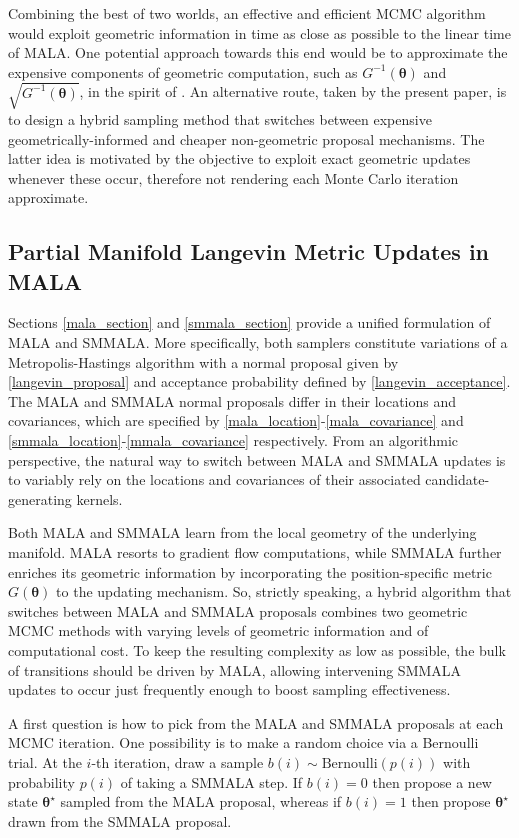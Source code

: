 \documentclass[twoside,11pt]{article}
\begin{document}
Combining the best of two worlds, an effective and efficient MCMC algorithm would exploit geometric information in time as 
close as possible to the linear time of MALA. One potential approach towards this end would be to approximate the expensive 
components of geometric computation, such as $G^{-1}(\boldsymbol{\theta})$ and $\sqrt{G^{-1}(\boldsymbol{\theta})}$, in the 
spirit of \cite{sim_bad_cem__sto}. An alternative route, taken by the present paper, is to design a hybrid sampling method 
that switches between expensive geometrically-informed and cheaper non-geometric proposal mechanisms. The latter idea is
motivated by the objective to exploit exact geometric updates whenever these occur, therefore not rendering each Monte Carlo 
iteration approximate.

\subsection{Partial Manifold Langevin Metric Updates in MALA}

Sections \ref{mala_section} and \ref{smmala_section} provide a unified formulation of MALA and SMMALA. More specifically, 
both samplers constitute variations of a Metropolis-Hastings algorithm with a normal proposal given by 
\eqref{langevin_proposal} and acceptance probability defined by \eqref{langevin_acceptance}. The MALA and SMMALA normal 
proposals differ in their locations and covariances, which are specified by \eqref{mala_location}-\eqref{mala_covariance} 
and \eqref{smmala_location}-\eqref{mmala_covariance} respectively. From an algorithmic perspective, the natural way to 
switch between MALA and SMMALA updates is to variably rely on the locations and covariances of their associated 
candidate-generating kernels.

Both MALA and SMMALA learn from the local geometry of the underlying manifold. MALA resorts to gradient flow computations, 
while SMMALA further enriches its geometric information by incorporating the position-specific metric 
$G(\boldsymbol{\theta})$ to the updating mechanism. So, strictly speaking, a hybrid algorithm that switches between MALA and 
SMMALA proposals combines two geometric MCMC methods with varying levels of geometric information and of computational cost. 
To keep the resulting complexity as low as possible, the bulk of transitions should be driven by MALA, allowing intervening 
SMMALA updates to occur just frequently enough to boost sampling effectiveness.

A first question is how to pick from the MALA and SMMALA proposals at each MCMC iteration. One possibility is to make a
random choice via a Bernoulli trial. At the $i$-th iteration, draw a sample $b(i)\sim \mbox{Bernoulli}(p(i))$ with
probability $p(i)$ of taking a SMMALA step. If $b(i)=0$ then propose a new state $\boldsymbol{\theta}^{\star}$ sampled from
the MALA proposal, whereas if $b(i)=1$ then propose $\boldsymbol{\theta}^{\star}$ drawn from the SMMALA proposal.
\end{document}
